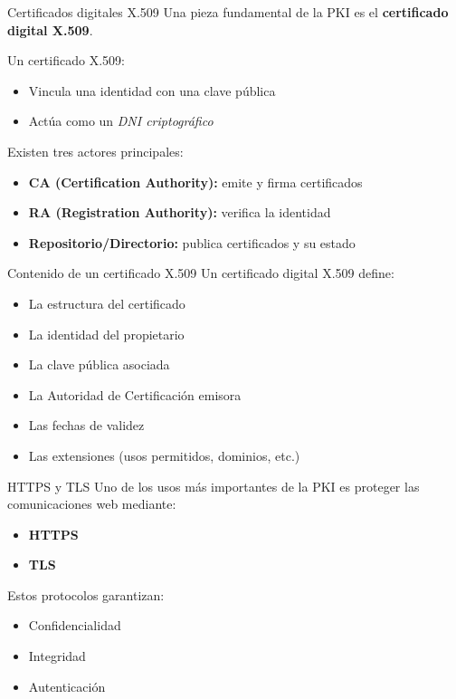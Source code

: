 \documentclass{beamer}
\begin{document}
\begin{frame}{Certificados digitales X.509}
Una pieza fundamental de la PKI es el \textbf{certificado digital X.509}.

\vspace{0.3cm}
Un certificado X.509:
\begin{itemize}
    \item Vincula una identidad con una clave pública
    \item Actúa como un \textit{DNI criptográfico}
\end{itemize}

\vspace{0.3cm}
Existen tres actores principales:
\begin{itemize}
    \item \textbf{CA (Certification Authority):} emite y firma certificados
    \item \textbf{RA (Registration Authority):} verifica la identidad
    \item \textbf{Repositorio/Directorio:} publica certificados y su estado
\end{itemize}
\end{frame}

\begin{frame}{Contenido de un certificado X.509}
Un certificado digital X.509 define:
\begin{itemize}
    \item La estructura del certificado
    \item La identidad del propietario
    \item La clave pública asociada
    \item La Autoridad de Certificación emisora
    \item Las fechas de validez
    \item Las extensiones (usos permitidos, dominios, etc.)
\end{itemize}
\end{frame}

\begin{frame}{HTTPS y TLS}
Uno de los usos más importantes de la PKI es proteger las comunicaciones web mediante:
\begin{itemize}
    \item \textbf{HTTPS}
    \item \textbf{TLS}
\end{itemize}

\vspace{0.3cm}
Estos protocolos garantizan:
\begin{itemize}
    \item Confidencialidad
    \item Integridad
    \item Autenticación
\end{itemize}
\end{frame}
\end{document}
